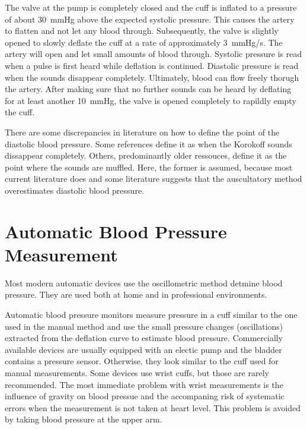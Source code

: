 The valve at the pump is completely closed and the cuff is inflated to a pressure of about \SI{30}{\mmHg} above the expected systolic pressure. This causes the artery to flatten and not let any blood through. Subsequently, the valve is slightly opened to slowly deflate the cuff at a rate of approximately \SI{3}{\mmHg/\second}. The artery will open and let small amounts of blood through. Systolic pressure is read when a pulse is first heard while deflation is continued. Diastolic pressure is read when the sounds disappear completely. Ultimately, blood can flow freely thorugh the artery. After making sure that no further sounds can be heard by deflating for at least another \SI{10}{\mmHg}, the valve is opened completely to rapildly empty the cuff.   \cite{NHS2019,Reeves1995}

There are some discrepancies in literature on how to define the point of the diastolic blood pressure. Some references define it as when the Korokoff sounds dissappear completely. \cite{NHS2019,Reeves1995} Others, predominantly older ressouces, define it as the point where the sounds are muffled.\cite{Boron2012} Here, the former is assumed, because most current literature does and some literature suggests that the auscultatory method overestimates diastolic blood pressure. \cite{Chandrasekhar2019}


\section{Automatic Blood Pressure Measurement}

Most modern automatic devices use the oscillometric method detmine blood pressure. They are used both at home and in professional environments.

Automatic blood pressure monitors measure pressure in a cuff similar to the one used in the manual method and use the small pressure changes (oscillations) extracted from the deflation curve to estimate blood pressure. Commercially available devices are usually equipped with an electic pump and the bladder contains a pressure sensor. Otherwise, they look similar to the cuff used for manual measurements. Some devices use wrist cuffs, but those are rarely recommended. \cite{BIHSOC2020} The most immediate problem with wrist measurements is the influence of gravity on blood pressue and the accompaning risk of systematic errors when the measurement is not taken at heart level. \cite{Boron2012} This problem is avoided by taking blood pressure at the upper arm.

